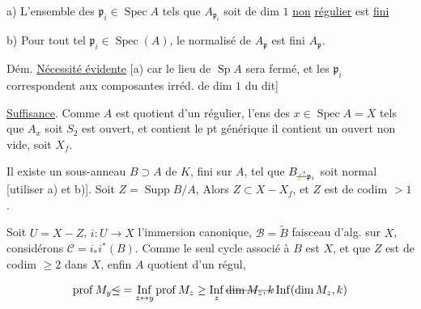 a) L'ensemble des $\mathfrak p_i\in\operatorname{Spec} A$ tels que $A_{\mathfrak p_i}$ soit de dim $1$ \uline{non} \uline{régulier} est \uline{fini}

b) Pour tout tel $\mathfrak p_i\in\operatorname{Spec}(A)$,  le normalisé de $A_{\mathfrak p}$ est fini  $A_{\mathfrak p}$.

Dém. \uline{Nécessité évidente} [a) car le lieu   de $\operatorname{Sp} A$ sera fermé, et les $\mathfrak p_i$ correspondent aux composantes irréd. de dim $1$ du dit]

\uline{Suffisance}.  Comme $A$ est quotient d'un régulier, l'ens des $x\in\operatorname{Spec} A=X$ tels que $A_x$ soit $S_2$ est ouvert, et contient le pt générique  il contient un ouvert non vide, soit $X_f$.

Il existe  un sous-anneau $B\supset A$ de $K$, fini sur $A$,  tel que  $B_{\deleted{\unsure{f}}\mathfrak p_i}$ soit normal [utiliser a) et b)]. Soit $Z=\operatorname{Supp} B/A$, Alors $Z\subset X-X_f$, et $Z$ est de codim $>1$.

Soit $U=X-Z$, $i:U\longrightarrow X$ l'immersion canonique, $\mathscr B=\widetilde B$ faisceau d'alg. sur $X$, considérons  $\mathcal C=i_*i^*(B)$. Comme le seul cycle  associé à $B$ est $X$, et que $Z$ est de codim $\geq2$ dans $X$, enfin $A$ quotient d'un régul,


\[
\operatorname{prof}M_y\deleted{\leq}=\mathop{\mathrm{Inf}}_{z\leftrightarrow y}\operatorname{prof}M_z
\geq\mathop{\mathrm{Inf}}_z\deleted{\dim M_z,k}\operatorname{Inf}(\dim M_z,k)
\]


